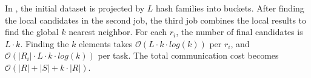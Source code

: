 In {\bf \LSH} \cite{Stupar10rankreduce-}, the initial dataset is projected by $L$ hash  families into 
buckets.
After finding the local candidates in the second job, the third job combines the local results to 
find the global $k$ nearest neighbor. For each $r_i$, the number of final candidates is $L\cdot k$. Finding the $k$ 
elements takes $\mathcal{O}(L \cdot k \cdot log(k))$ per $r_i$, and $\mathcal{O}(|R_i| \cdot L \cdot k \cdot log(k))$ 
per task. The total communication cost becomes $\mathcal{O}(|R|+|S|+k\cdot |R|)$.
%



